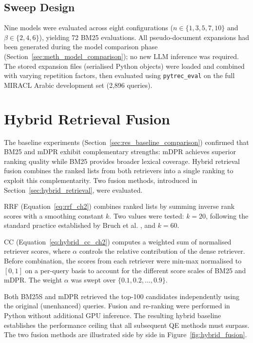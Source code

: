\subsection{Sweep Design}
Nine models were evaluated across eight configurations ($n \in \{1, 3, 5, 7, 10\}$ and $\beta \in \{2, 4, 6\}$), yielding 72 BM25 evaluations. All pseudo-document expansions had been generated during the model comparison phase (Section~\ref{sec:meth_model_comparison}); no new LLM inference was required. The stored expansion files (serialised Python objects) were loaded and combined with varying repetition factors, then evaluated using \texttt{pytrec\_eval} on the full MIRACL Arabic development set (2,896 queries). 
\section{Hybrid Retrieval Fusion}
\label{sec:meth_hybrid}

The baseline experiments (Section~\ref{sec:res_baseline_comparison}) confirmed that BM25 and mDPR exhibit complementary strengths: mDPR achieves superior ranking quality while BM25 provides broader lexical coverage. Hybrid retrieval fusion combines the ranked lists from both retrievers into a single ranking to exploit this complementarity. Two fusion methods, introduced in Section~\ref{sec:hybrid_retrieval}, were evaluated.

RRF (Equation~\ref{eq:rrf_ch2}) combines ranked lists by summing inverse rank scores with a smoothing constant $k$. Two values were tested: $k=20$, following the standard practice established by Bruch et al. \cite{bruch_2023_rrf}, and $k=60$.

CC (Equation~\ref{eq:hybrid_cc_ch2}) computes a weighted sum of normalised retriever scores, where $\alpha$ controls the relative contribution of the dense retriever. Before combination, the scores from each retriever were min-max normalised to $[0, 1]$ on a per-query basis to account for the different score scales of BM25 and mDPR. The weight $\alpha$ was swept over $\{0.1, 0.2, \ldots, 0.9\}$.

Both BM25S and mDPR retrieved the top-100 candidates independently using the original (unenhanced) queries. Fusion and re-ranking were performed in Python without additional GPU inference. The resulting hybrid baseline establishes the performance ceiling that all subsequent QE methods must surpass. The two fusion methods are illustrated side by side in Figure~\ref{fig:hybrid_fusion}.

